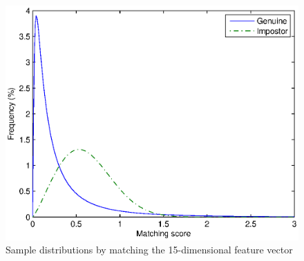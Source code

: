 % 
% 
% 

\begin{figure}[htb]
  \begin{center}
    \includegraphics[scale=1]{ch-experiment/figures/11p.eps}
    \caption{Sample distributions by matching the 15-dimensional feature vector}
    \label{fig:experiment:11p}
  \end{center}
\end{figure}

